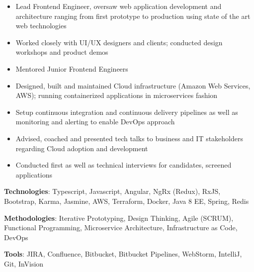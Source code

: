 \documentclass[10pt, a4paper, ragged2e]{altacv}
\begin{document}
	
		
\begin{fullwidth}
	\makecvheader
\end{fullwidth}	


\begin{itemize}
	\item Lead Frontend Engineer, oversaw web application development and architecture ranging from first prototype to production using state of the art web technologies
	\item Worked closely with UI/UX designers and clients; conducted design workshops and product demos
	\item Mentored Junior Frontend Engineers
	\item Designed, built and maintained Cloud infrastructure (Amazon Web Services, AWS); running containerized applications in microservices fashion
	\item Setup continuous integration and continuous delivery pipelines as well as monitoring and alerting to enable DevOps approach
	\item Advised, coached and presented tech talks to business and IT stakeholders regarding Cloud adoption and development
	\item Conducted first as well as technical interviews for candidates, screened applications
\end{itemize}

\smallskip
\textbf{Technologies}: Typescript, Javascript, Angular, NgRx (Redux), RxJS, Bootstrap, Karma, Jasmine, AWS, Terraform, Docker, Java 8 EE, Spring, Redis

\smallskip
\textbf{Methodologies}: Iterative Prototyping, Design Thinking, Agile (SCRUM), Functional Programming, Microservice Architecture, Infrastructure as Code, DevOps

\smallskip
\textbf{Tools}: JIRA, Confluence, Bitbucket, Bitbucket Pipelines, WebStorm, IntelliJ, Git, InVision

\divider
\end{document}

